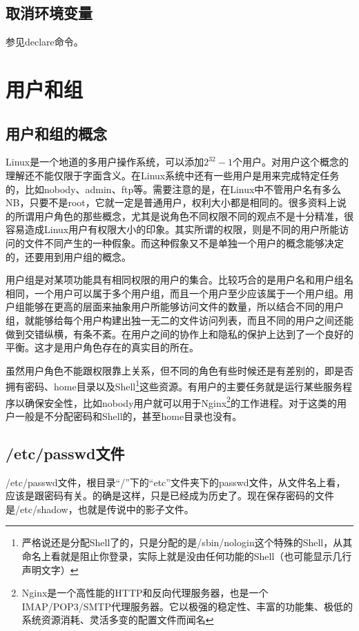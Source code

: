\subsection{取消环境变量}
参见declare命令。



\section{用户和组}
\subsection{用户和组的概念}
Linux是一个地道的多用户操作系统，可以添加$2^{32}-1$个用户。对用户这个概念的理解还不能仅限于字面含义。在Linux系统中还有一些用户是用来完成特定任务的，比如nobody、admin、ftp等。需要注意的是，在Linux中不管用户名有多么NB，只要不是root，它就一定是普通用户，权利大小都是相同的。很多资料上说的所谓用户角色的那些概念，尤其是说角色不同权限不同的观点不是十分精准，很容易造成Linux用户有权限大小的印象。其实所谓的权限，则是不同的用户所能访问的文件不同产生的一种假象。而这种假象又不是单独一个用户的概念能够决定的，还要用到用户组的概念。

用户组是对某项功能具有相同权限的用户的集合。比较巧合的是用户名和用户组名相同，一个用户可以属于多个用户组，而且一个用户至少应该属于一个用户组。用户组能够在更高的层面来抽象用户所能够访问文件的数量，所以结合不同的用户组，就能够给每个用户构建出独一无二的文件访问列表，而且不同的用户之间还能做到交错纵横，有条不紊。在用户之间的协作上和隐私的保护上达到了一个良好的平衡。这才是用户角色存在的真实目的所在。

虽然用户角色不能跟权限靠上关系，但不同的角色有些时候还是有差别的，即是否拥有密码、home目录以及Shell\footnote{严格说还是分配Shell了的，只是分配的是/sbin/nologin这个特殊的Shell，从其命名上看就是阻止你登录，实际上就是没由任何功能的Shell（也可能显示几行声明文字）}这些资源。有用户的主要任务就是运行某些服务程序以确保安全性，比如nobody用户就可以用于Nginx\footnote{Nginx是一个高性能的HTTP和反向代理服务器，也是一个IMAP/POP3/SMTP代理服务器。它以极强的稳定性、丰富的功能集、极低的系统资源消耗、灵活多变的配置文件而闻名}的工作进程。对于这类的用户一般是不分配密码和Shell的，甚至home目录也没有。





\newpage
\subsection{/etc/passwd文件}
/etc/passwd文件，根目录“/”下的“etc”文件夹下的passwd文件，从文件名上看，应该是跟密码有关。的确是这样，只是已经成为历史了。现在保存密码的文件是/etc/shadow，也就是传说中的影子文件。

